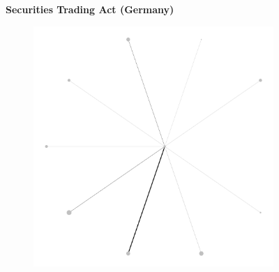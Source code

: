 \documentclass[varwidth, border=0pt]{standalone}
\begin{document}
\begin{figure}
\begin{subfigure}{0.24\linewidth}
		\vspace*{3pt}
	\end{subfigure}
		\end{figure}\vspace{-6pt}

		\vspace*{-6pt}\begin{figure}
			\centering
			\caption*{\textbf{Securities Trading Act (Germany)}}
			\caption*{\textbf{\sffamily(a)}\quad Reliance}
		\vspace*{-2pt}\begin{subfigure}{0.24\linewidth}
			\centering
			\includegraphics[width=\linewidth]{../../graphics/evolution/reliance-de-wphg-1998.pdf}%
		\end{subfigure}~%
		\begin{subfigure}{0.24\linewidth}
			\centering

\end{subfigure}
\end{figure}
\end{document}
